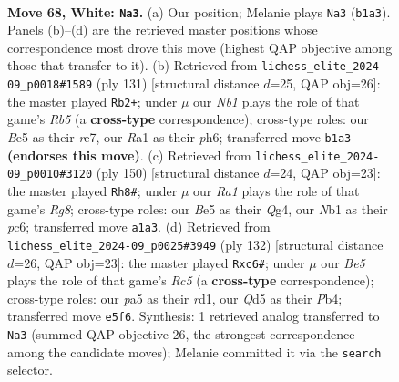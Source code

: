 \documentclass[11pt]{article}
\begin{document}
\clearpage

\begin{figure}[p]\centering
\begin{subfigure}{0.46\textwidth}\centering
\resizebox{\linewidth}{!}{%
\newchessgame
\chessboard[
  setfen={2k5/8/8/p2QB3/P4p2/8/8/RN4K1 w - - 0 68},
  showmover=false,
  pgfstyle=straightmove, color=movearrow, markmove={b1-a3}
]}
\caption{}
\end{subfigure}\hfill
\begin{subfigure}{0.46\textwidth}\centering
\resizebox{\linewidth}{!}{%
\newchessgame
\chessboard[
  setfen={8/4Rp2/2k4P/5p2/1r1q1P2/8/2K5/8 b - - 19 66},
  showmover=false,
  pgfstyle=straightmove, color=movearrow, markmove={b4-b2}
]}
\caption{}
\end{subfigure}
\\[4pt]
\begin{subfigure}{0.46\textwidth}\centering
\resizebox{\linewidth}{!}{%
\newchessgame
\chessboard[
  setfen={6R1/8/2p2P1k/8/3p2Q1/6p1/6K1/8 w - - 0 76},
  showmover=false,
  pgfstyle=straightmove, color=movearrow, markmove={g8-h8}
]}
\caption{}
\end{subfigure}\hfill
\begin{subfigure}{0.46\textwidth}\centering
\resizebox{\linewidth}{!}{%
\newchessgame
\chessboard[
  setfen={1Q6/4K3/k1p5/2R1B3/1P6/8/8/3r4 w - - 0 67},
  showmover=false,
  pgfstyle=straightmove, color=movearrow, markmove={c5-c6}
]}
\caption{}
\end{subfigure}
\caption{\textbf{Move 68, White: \texttt{Na3}.} (a) Our position; Melanie plays \texttt{Na3} (\texttt{b1a3}). Panels (b)--(d) are the retrieved master positions whose correspondence most drove this move (highest QAP objective among those that transfer to it). (b) Retrieved from \texttt{lichess\_elite\_2024-09\_p0018\#1589} (ply 131) [structural distance $d$=25, QAP obj=26]: the master played \texttt{Rb2+}; under $\mu$ our \emph{Nb1} plays the role of that game's \emph{Rb5} (a \textbf{cross-type} correspondence); cross-type roles: our \emph{B}e5 as their \emph{r}e7, our \emph{R}a1 as their \emph{p}h6; transferred move \texttt{b1a3} \textbf{(endorses this move)}. (c) Retrieved from \texttt{lichess\_elite\_2024-09\_p0010\#3120} (ply 150) [structural distance $d$=24, QAP obj=23]: the master played \texttt{Rh8\#}; under $\mu$ our \emph{Ra1} plays the role of that game's \emph{Rg8}; cross-type roles: our \emph{B}e5 as their \emph{Q}g4, our \emph{N}b1 as their \emph{p}c6; transferred move \texttt{a1a3}. (d) Retrieved from \texttt{lichess\_elite\_2024-09\_p0025\#3949} (ply 132) [structural distance $d$=26, QAP obj=23]: the master played \texttt{Rxc6\#}; under $\mu$ our \emph{Be5} plays the role of that game's \emph{Rc5} (a \textbf{cross-type} correspondence); cross-type roles: our \emph{p}a5 as their \emph{r}d1, our \emph{Q}d5 as their \emph{P}b4; transferred move \texttt{e5f6}. Synthesis: 1 retrieved analog transferred to \texttt{Na3} (summed QAP objective 26, the strongest correspondence among the candidate moves); Melanie committed it via the \texttt{search} selector.}
\label{fig:thought-m134}
\end{figure}
\end{document}
